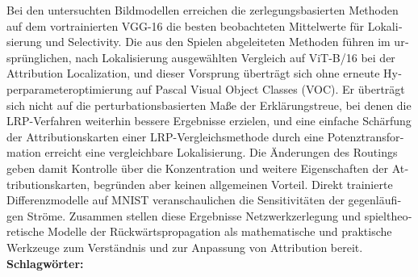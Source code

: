 \begin{otherlanguage}{ngerman}
Bei den untersuchten Bildmodellen erreichen die zerlegungsbasierten Methoden auf dem vortrainierten VGG-16 die besten beobachteten Mittelwerte für Lokalisierung und Selectivity. Die aus den Spielen abgeleiteten Methoden führen im ursprünglichen, nach Lokalisierung ausgewählten Vergleich auf ViT-B/16 bei der Attribution Localization, und dieser Vorsprung überträgt sich ohne erneute Hyperparameteroptimierung auf Pascal Visual Object Classes (VOC). Er überträgt sich nicht auf die perturbationsbasierten Maße der Erklärungstreue, bei denen die LRP-Verfahren weiterhin bessere Ergebnisse erzielen, und eine einfache Schärfung der Attributionskarten einer LRP-Vergleichsmethode durch eine Potenztransformation erreicht eine vergleichbare Lokalisierung. Die Änderungen des Routings geben damit Kontrolle über die Konzentration und weitere Eigenschaften der Attributionskarten, begründen aber keinen allgemeinen Vorteil. Direkt trainierte Differenzmodelle auf MNIST veranschaulichen die Sensitivitäten der gegenläufigen Ströme. Zusammen stellen diese Ergebnisse Netzwerkzerlegung und spieltheoretische Modelle der Rückwärtspropagation als mathematische und praktische Werkzeuge zum Verständnis und zur Anpassung von Attribution bereit.
\\[2ex]
\textbf{Schlagwörter:} \itshape \germankeywords
\end{otherlanguage}